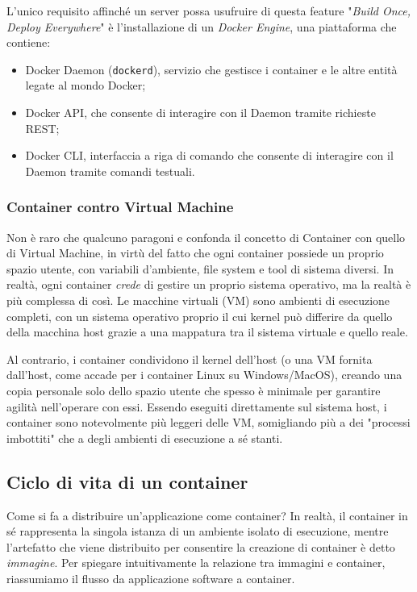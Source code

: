 L'unico requisito affinché un server possa usufruire di questa feature "\emph{Build Once, Deploy Everywhere}" è l'installazione di un \emph{Docker Engine}, una piattaforma che contiene:
\begin{itemize}
  \item Docker Daemon (\texttt{dockerd}), servizio che gestisce i container e le altre entità legate al mondo Docker;
  \item Docker API, che consente di interagire con il Daemon tramite richieste REST;
  \item Docker CLI, interfaccia a riga di comando che consente di interagire con il Daemon tramite comandi testuali.
\end{itemize}

\subsubsection{Container contro Virtual Machine}
Non è raro che qualcuno paragoni e confonda il concetto di Container con quello di Virtual Machine, in virtù del fatto che ogni container possiede un proprio spazio utente, con variabili d'ambiente, file system e tool di sistema diversi. In realtà, ogni container \emph{crede} di gestire un proprio sistema operativo, ma la realtà è più complessa di così.
Le macchine virtuali (VM) sono ambienti di esecuzione completi, con un sistema operativo proprio il cui kernel può differire da quello della macchina host grazie a una mappatura tra il sistema virtuale e quello reale.

Al contrario, i container condividono il kernel dell'host (o una VM fornita dall'host, come accade per i container Linux su Windows/MacOS), creando una copia personale solo dello spazio utente che spesso è minimale per garantire agilità nell'operare con essi. Essendo eseguiti direttamente sul sistema host, i container sono notevolmente più leggeri delle VM, somigliando più a dei "processi imbottiti" che a degli ambienti di esecuzione a sé stanti.

\subsection{Ciclo di vita di un container}
Come si fa a distribuire un'applicazione come container?
In realtà, il container in sé rappresenta la singola istanza di un ambiente isolato di esecuzione, mentre l'artefatto che viene distribuito per consentire la creazione di container è detto \emph{immagine}. Per spiegare intuitivamente la relazione tra immagini e container, riassumiamo il flusso da applicazione software a container.

